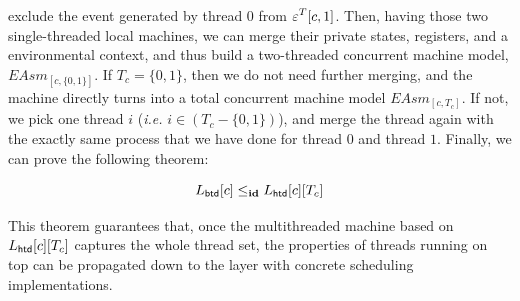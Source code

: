 exclude the event generated by thread 0 from $\oracle^{T}[c, 1]$.
Then, having those two single-threaded local machines,
we can merge their private states, registers, and a environmental context, 
and thus build a two-threaded concurrent machine model, $EAsm_{[c, \{0, 1\}]}$.
If $T_c = \{0, 1\}$, then we do not need further merging, 
and the machine directly turns into a total concurrent machine 
model $EAsm_{[c, T_c]}$. 
If not, we pick one thread $i$ (\textit{i.e.} $i \in (T_c - \{0, 1\})$), 
and merge the thread again with the exactly 
same process that we have done for thread $0$ and thread $1$.
Finally,
we can prove
the following theorem:
\begin{theorem}
\label{thread_composition}
$$
L_{\mathsf{\textcolor{black}{btd}}}[c]\le_{\textbf{id}} L_{\mathsf{\textcolor{black}{htd}}}[c][T_c]
$$%
\end{theorem}%
\noindent This theorem guarantees that,
once the multithreaded machine based on $L_{\mathsf{\textcolor{black}{htd}}}[c][T_c]$ captures
the whole thread set,
 the properties of  threads running on top
can be propagated down to the layer with concrete
scheduling implementations.

